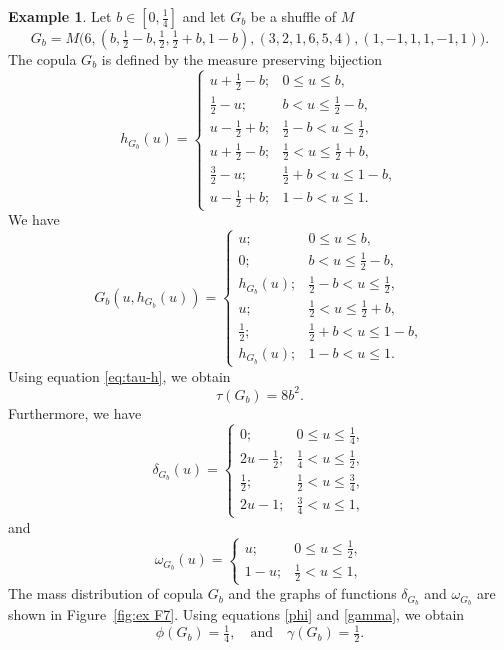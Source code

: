 \documentclass[12pt,a4paper]{amsart}
\theoremstyle{definition}
\newtheorem{example}[theorem]{Example}
\begin{document}
\begin{example}\label{ex:F7}
Let $b \in [0, \tfrac14]$  and let $G_b$ be a shuffle of $M$
$$G_b = M\big(6, (b, \tfrac12 - b, \tfrac12, \tfrac12 + b, 1-b), (3, 2, 1, 6, 5, 4), (1, -1, 1, 1, -1, 1)\big).$$
The copula $G_b$ is defined by the measure preserving bijection 
$$ h_{G_b}(u) =  \begin{cases}
            u + \tfrac12 - b; &  0 \le u \le b, \\
            \tfrac12 - u; &  b < u \le \tfrac12 - b, \\
            u - \tfrac12 + b; &  \tfrac12 - b < u \le \tfrac12, \\
            u + \tfrac12 - b; &  \tfrac12 < u \le \tfrac12 + b, \\
            \tfrac32 - u; &  \tfrac12 + b < u \le 1-b, \\
            u - \tfrac12 + b; &  1-b < u \le 1.
            \end{cases}
$$
We have 
$$ G_b(u,h_{G_b}(u)) =  \begin{cases}
            u; &  0 \le u \le b, \\
            0; &  b < u \le \tfrac12 - b, \\
            h_{G_b}(u); &  \tfrac12 - b < u \le \tfrac12, \\
            u; &  \tfrac12 < u \le \tfrac12 + b, \\
            \tfrac12; &  \tfrac12 + b < u \le 1 - b, \\
            h_{G_b}(u); &  1 - b < u \le 1.
            \end{cases}
$$
Using equation \eqref{eq:tau-h}, we obtain
$$  \tau(G_b) = 8b^2. $$
Furthermore, we have
$$ \delta_{G_b}(u) =  \begin{cases}
            0; &  0 \le u \le \tfrac14, \\
            2u - \tfrac12; &  \tfrac14 < u \le \tfrac12, \\
            \tfrac12; &  \tfrac12 < u \le \tfrac34, \\
            2u-1; &  \tfrac34 < u \le 1, 
            \end{cases}
$$
and
$$ \omega_{G_b}(u) = \begin{cases}
            u; &  0 \le u \le \tfrac12, \\
            1-u; &  \tfrac12 < u \le 1, 
            \end{cases}
$$
The mass distribution of copula $G_b$ and the graphs of functions $\delta_{G_b}$ and $\omega_{G_b}$ are shown in Figure~\ref{fig:ex F7}.
Using equations \eqref{phi}  and \eqref{gamma}, we obtain
$$  \phi(G_b) = \tfrac14, \quad \text{and} \quad \gamma(G_b) = \tfrac12. $$


\end{example}
\end{document}
